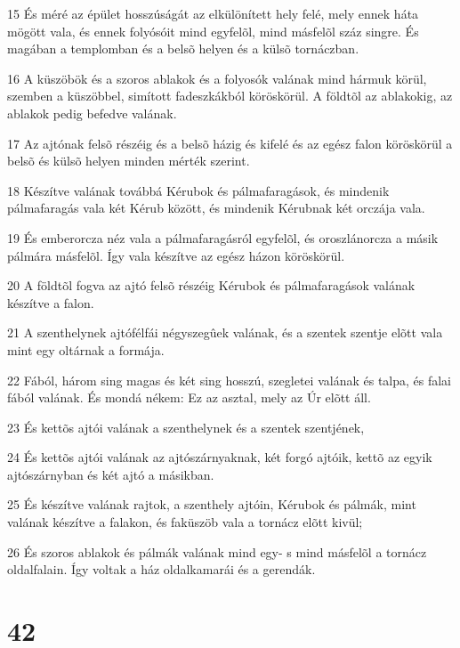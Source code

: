 \par 15 És méré az épület hosszúságát az elkülönített hely felé, mely ennek háta mögött vala, és ennek folyósóit mind egyfelõl, mind másfelõl száz singre. És magában a templomban és a belsõ helyen és a külsõ tornáczban.
\par 16 A küszöbök és a szoros ablakok és a folyosók valának mind hármuk körül, szemben a küszöbbel, simított fadeszkákból köröskörül. A földtõl az ablakokig, az ablakok pedig befedve valának.
\par 17 Az ajtónak felsõ részéig és a belsõ házig és kifelé és az egész falon köröskörül a belsõ és külsõ helyen minden mérték szerint.
\par 18 Készítve valának továbbá Kérubok és pálmafaragások, és mindenik pálmafaragás vala két Kérub között, és mindenik Kérubnak két orczája vala.
\par 19 És emberorcza néz vala a pálmafaragásról egyfelõl, és oroszlánorcza a másik pálmára másfelõl. Így vala készítve az egész házon köröskörül.
\par 20 A földtõl fogva az ajtó felsõ részéig Kérubok és pálmafaragások valának készítve a falon.
\par 21 A szenthelynek ajtófélfái négyszegûek valának, és a szentek szentje elõtt vala mint egy oltárnak a formája.
\par 22 Fából, három sing magas és két sing hosszú, szegletei valának és talpa, és falai fából valának. És mondá nékem: Ez az asztal, mely az Úr elõtt áll.
\par 23 És kettõs ajtói valának a szenthelynek és a szentek szentjének,
\par 24 És kettõs ajtói valának az ajtószárnyaknak, két forgó ajtóik, kettõ az egyik ajtószárnyban és két ajtó a másikban.
\par 25 És készítve valának rajtok, a szenthely ajtóin, Kérubok és pálmák, mint valának készítve a falakon, és faküszöb vala a tornácz elõtt kivül;
\par 26 És szoros ablakok és pálmák valának mind egy- s mind másfelõl a tornácz oldalfalain. Így voltak a ház oldalkamarái és a gerendák.

\chapter{42}

